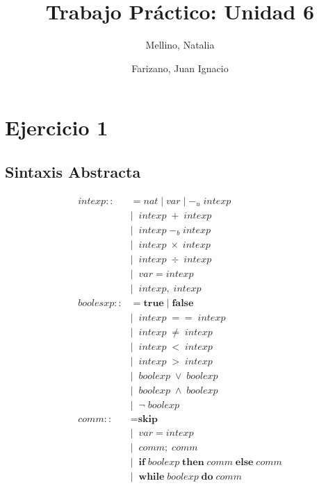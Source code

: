 \documentclass[11pt]{article}
\title{Trabajo Práctico: Unidad 6}
\author{Mellino, Natalia \and Farizano, Juan Ignacio}
\date{}
\begin{document}
\maketitle


\section{Ejercicio 1}
\subsection{Sintaxis Abstracta}

\begin{align*}
intexp ::&= nat \; | \; var \; | \; -_u \; intexp \\
         &| \;\; intexp \; +  \; intexp \\
         &| \;\; intexp \; -_b  \; intexp \\
         &| \;\; intexp \; \times  \; intexp \\
         &| \;\; intexp \; \div  \; intexp \\
         &| \;\; var = intexp \\
         &| \;\; intexp, \; intexp \\
boolesxp ::&= \textbf{true} \; | \; \textbf{false} \\
           &| \;\; intexp \; ==  \; intexp \\
           &| \;\; intexp \; \neq  \; intexp \\
           &| \;\; intexp \; <  \; intexp \\
           &| \;\; intexp \; >  \; intexp \\
           &| \;\; boolexp \; \lor  \; boolexp \\
           &| \;\; boolexp \; \land  \; boolexp \\
           &| \;\; \neg \; boolexp \\
comm ::&= \textbf{skip} \\
       &| \;\; var = intexp \\
       &| \;\; comm; \; comm \\
       &| \;\; \textbf{if} \; boolexp \; \textbf{then} \; comm \; \textbf{else} \; comm \\
       &| \; \; \textbf{while} \; boolexp \; \textbf{do} \; comm
\end{align*}
\end{document}
